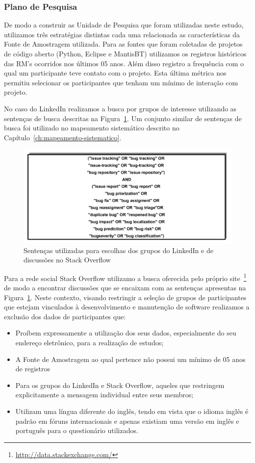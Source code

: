 \subsubsection{Plano de Pesquisa}

De modo a construir as Unidade de Pesquisa que foram utilizadas neste estudo,
utilizamos três estratégias distintas cada uma relacionada as características da
Fonte de Amostragem utilizada. Para as fontes que foram coletadas de projetos de
código aberto (Python, Eclipse e MantisBT) utilizamos os registros históricos
das RM's ocorridos nos últimos 05 anos. Além disso registro a frequência com o
qual um participante teve contato com o projeto. Esta última métrica nos
permitiu selecionar os participantes que tenham um mínimo de interação com
projeto.

No caso do LinkedIn realizamos a busca por grupos de interesse utilizando as
sentenças de busca descritas na Figura~\ref{fig:setencas-grupos}. Um conjunto
similar de sentenças de busca foi utilizado no mapeamento sistemático  descrito
no Capítulo~\ref{ch:mapeamento-sistematico}.

\begin{figure}[htpb]
	\centering
	\includegraphics[width=0.8\linewidth]{./chapter-pesquisa-com-profissionais/img/setencas-grupos.pdf}
	\caption{Sentenças utilizadas para escolhas dos grupos do LinkedIn e de
		discussões no Stack Overflow}
\label{fig:setencas-grupos}
\end{figure}

Para a rede social Stack Overflow utilizamo a busca oferecida pelo próprio
site~\footnote{\url{http://data.stackexchange.com/}} de modo a encontrar
discussões que se encaixam com as sentenças apresentas na
Figura~\ref{fig:setencas-grupos}. Neste contexto, visando restringir a seleção
de grupos de participantes que estejam vinculados à desenvolvimento e manutenção
de software realizamos a exclusão dos dados de participantes que:

\begin{itemize}
	\item Proíbem expressamente a utilização dos seus dados, especialmente do
		seu endereço eletrônico, para a realização de estudos;
	\item A Fonte de Amostragem ao qual pertence não possui um mínimo de 05 anos
		de registros
	\item Para os grupos do LinkedIn e Stack Overflow, aqueles que restringem
		explicitamente a mensagem individual entre seus membros;
    \item Utilizam uma língua diferente do inglês, tendo em vista que o idioma
		inglês é padrão em fóruns internacionais e apenas existiam uma versão em
		inglês e português para o questionário utilizados.
\end{itemize}

